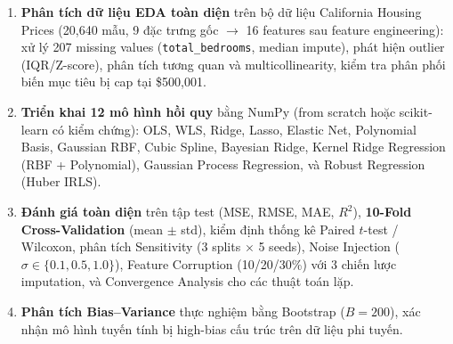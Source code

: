 \documentclass[12pt,a4paper]{article}
\begin{document}
\begin{enumerate}
  \item \textbf{Phân tích dữ liệu EDA toàn diện} trên bộ dữ liệu
        California Housing Prices (20{,}640 mẫu, 9 đặc trưng gốc $\to$
        16 features sau feature engineering):
        xử lý 207 missing values (\texttt{total\_bedrooms}, median impute),
        phát hiện outlier (IQR/Z-score), phân tích tương quan và
        multicollinearity, kiểm tra phân phối biến mục tiêu bị cap tại
        \$500{,}001.

  \item \textbf{Triển khai 12 mô hình hồi quy} bằng NumPy (from scratch
        hoặc scikit-learn có kiểm chứng):
        OLS, WLS, Ridge, Lasso, Elastic Net, Polynomial Basis,
        Gaussian RBF, Cubic Spline, Bayesian Ridge,
        Kernel Ridge Regression (RBF + Polynomial),
        Gaussian Process Regression, và Robust Regression (Huber IRLS).

  \item \textbf{Đánh giá toàn diện} trên tập test (MSE, RMSE, MAE, $R^2$),
        \textbf{10-Fold Cross-Validation} (mean $\pm$ std), kiểm định thống
        kê Paired $t$-test / Wilcoxon, phân tích Sensitivity (3 splits $\times$
        5 seeds), Noise Injection ($\sigma \in \{0.1, 0.5, 1.0\}$),
        Feature Corruption (10/20/30\%) với 3 chiến lược imputation,
        và Convergence Analysis cho các thuật toán lặp.

  \item \textbf{Phân tích Bias--Variance} thực nghiệm bằng Bootstrap
        ($B = 200$), xác nhận mô hình tuyến tính bị high-bias cấu trúc
        trên dữ liệu phi tuyến.
\end{enumerate}
\end{document}

